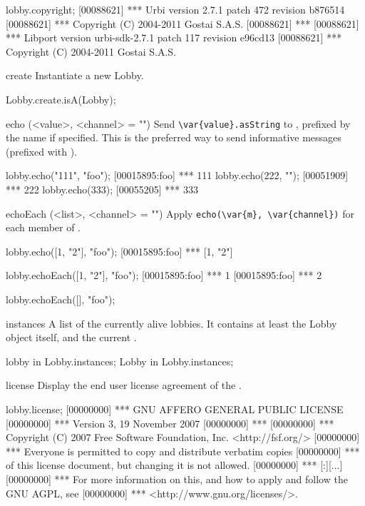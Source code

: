 \begin{urbiscriptapi}
\begin{urbiscript}
lobby.copyright;
[00088621] *** Urbi version 2.7.1 patch 472 revision b876514
[00088621] *** Copyright (C) 2004-2011 Gostai S.A.S.
[00088621] ***
[00088621] *** Libport version urbi-sdk-2.7.1 patch 117 revision e96cd13
[00088621] *** Copyright (C) 2004-2011 Gostai S.A.S.
\end{urbiscript}

\item[create]
  Instantiate a new Lobby.
\begin{urbiassert}
Lobby.create.isA(Lobby);
\end{urbiassert}

\item[echo](<value>, <channel> = "")%
  Send \lstinline|\var{value}.asString| to \this, prefixed
  by the   name if specified.  This is
  the preferred way to send informative messages (prefixed with
  \samp{***}).
\begin{urbiscript}
lobby.echo("111", "foo");
[00015895:foo] *** 111
lobby.echo(222, "");
[00051909] *** 222
lobby.echo(333);
[00055205] *** 333
\end{urbiscript}

\item[echoEach](<list>, <channel> = "")%
  Apply \lstinline|echo(\var{m}, \var{channel})| for each member  of
  .
\begin{urbiscript}
lobby.echo([1, "2"], "foo");
[00015895:foo] *** [1, "2"]

lobby.echoEach([1, "2"], "foo");
[00015895:foo] *** 1
[00015895:foo] *** 2

lobby.echoEach([], "foo");
\end{urbiscript}


\item[instances]
  A list of the currently alive lobbies.  It contains at least the Lobby
  object itself, and the current .
\begin{urbiassert}
lobby in Lobby.instances;
Lobby in Lobby.instances;
\end{urbiassert}

\item[license]
  Display the end user license agreement of the \usdk.
\begin{urbiunchecked}
lobby.license;
[00000000] ***                     GNU AFFERO GENERAL PUBLIC LICENSE
[00000000] ***                        Version 3, 19 November 2007
[00000000] ***
[00000000] ***  Copyright (C) 2007 Free Software Foundation, Inc. <http://fsf.org/>
[00000000] ***  Everyone is permitted to copy and distribute verbatim copies
[00000000] ***  of this license document, but changing it is not allowed.
[00000000] ***
[:][...]
[00000000] *** For more information on this, and how to apply and follow the GNU AGPL, see
[00000000] *** <http://www.gnu.org/licenses/>.
\end{urbiunchecked}


\end{urbiscriptapi}
